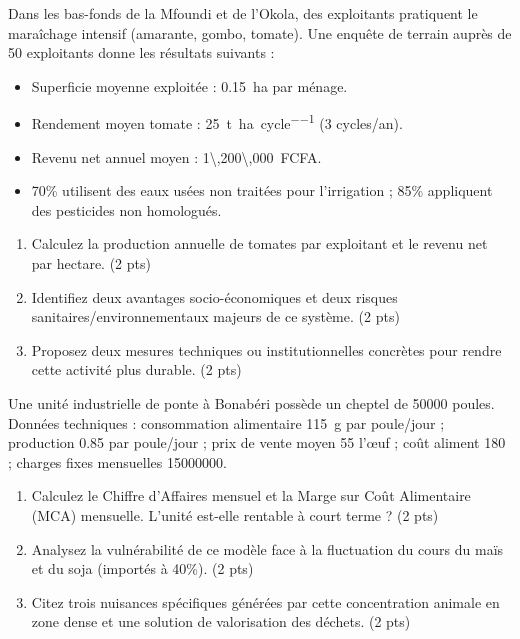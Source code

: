 \documentclass[11pt]{article}
\begin{document}
\begin{exercice}
\label{exo:yaounde}
Dans les bas-fonds de la Mfoundi et de l'Okola, des exploitants pratiquent le maraîchage intensif (amarante, gombo, tomate). Une enquête de terrain auprès de 50 exploitants donne les résultats suivants :
\begin{itemize}
    \item Superficie moyenne exploitée : \SI{0,15}{\hectare} par ménage.
    \item Rendement moyen tomate : \SI{25}{\tonne\per\hectare\per cycle} (3 cycles/an).
    \item Revenu net annuel moyen : \SI{1\,200\,000}{FCFA}.
    \item 70\% utilisent des eaux usées non traitées pour l'irrigation ; 85\% appliquent des pesticides non homologués.
\end{itemize}
\begin{enumerate}
    \item Calculez la production annuelle de tomates par exploitant et le revenu net par hectare. \hfill (2 pts)
    \item Identifiez deux avantages socio-économiques et deux risques sanitaires/environnementaux majeurs de ce système. \hfill (2 pts)
    \item Proposez deux mesures techniques ou institutionnelles concrètes pour rendre cette activité plus durable. \hfill (2 pts)
\end{enumerate}
\end{exercice}

\begin{exercice}
\label{exo:elevage}
Une unité industrielle de ponte à Bonabéri possède un cheptel de \num{50000} poules. Données techniques : consommation alimentaire \SI{115}{\gram} par poule/jour ; production \SI{0,85}{} par poule/jour ; prix de vente moyen \SI{55}{} l'œuf ; coût aliment \SI{180}{} ; charges fixes mensuelles \SI{15000000}{}.
\begin{enumerate}
    \item Calculez le Chiffre d'Affaires mensuel et la Marge sur Coût Alimentaire (MCA) mensuelle. L'unité est-elle rentable à court terme ? \hfill (2 pts)
    \item Analysez la vulnérabilité de ce modèle face à la fluctuation du cours du maïs et du soja (importés à 40\%). \hfill (2 pts)
    \item Citez trois nuisances spécifiques générées par cette concentration animale en zone dense et une solution de valorisation des déchets. \hfill (2 pts)
\end{enumerate}
\end{exercice}
\end{document}
